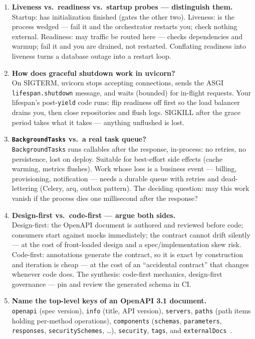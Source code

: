 \begin{enumerate}[label=\textbf{Q\arabic*.}, leftmargin=1.3cm, itemsep=0.8em]
\item \textbf{Liveness vs.\ readiness vs.\ startup probes --- distinguish
them.}\\
Startup: has initialization finished (gates the other two). Liveness: is the
process wedged --- fail it and the orchestrator restarts you; check nothing
external. Readiness: may traffic be routed here --- checks dependencies and
warmup; fail it and you are drained, not restarted. Conflating readiness
into liveness turns a database outage into a restart loop.

\item \textbf{How does graceful shutdown work in uvicorn?}\\
On SIGTERM, uvicorn stops accepting connections, sends the ASGI
\texttt{lifespan.shutdown} message, and waits (bounded) for in-flight
requests. Your lifespan's post-\texttt{yield} code runs: flip readiness off
first so the load balancer drains you, then close repositories and flush
logs. SIGKILL after the grace period takes what it takes --- anything
unflushed is lost.

\item \textbf{\texttt{BackgroundTasks} vs.\ a real task queue?}\\
\texttt{BackgroundTasks} runs callables after the response, in-process: no
retries, no persistence, lost on deploy. Suitable for best-effort side
effects (cache warming, metrics flushes). Work whose loss is a business
event --- billing, provisioning, notification --- needs a durable queue with
retries and dead-lettering (Celery, arq, outbox pattern). The deciding
question: may this work vanish if the process dies one millisecond after the
response?

\item \textbf{Design-first vs.\ code-first --- argue both sides.}\\
Design-first: the OpenAPI document is authored and reviewed before code;
consumers start against mocks immediately; the contract cannot drift
silently --- at the cost of front-loaded design and a spec/implementation
skew risk. Code-first: annotations generate the contract, so it is exact by
construction and iteration is cheap --- at the cost of an ``accidental
contract'' that changes whenever code does. The synthesis: code-first
mechanics, design-first governance --- pin and review the generated schema
in CI.

\item \textbf{Name the top-level keys of an OpenAPI 3.1 document.}\\
\texttt{openapi} (spec version), \texttt{info} (title, API version),
\texttt{servers}, \texttt{paths} (path items holding per-method operations),
\texttt{components} (\texttt{schemas}, \texttt{parameters},
\texttt{responses}, \texttt{securitySchemes}, \ldots), \texttt{security},
\texttt{tags}, and \texttt{externalDocs}~\cite{openapi31}.


\end{enumerate}
